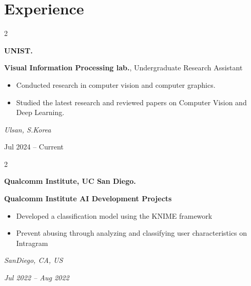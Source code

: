 \documentclass[10pt, letterpaper]{article}
\newenvironment{highlights}{
    \begin{itemize}[
        topsep=0.10 cm,
        parsep=0.10 cm,
        partopsep=0pt,
        itemsep=0pt,
        leftmargin=0.4 cm + 10pt
    ]
}{
    \end{itemize}
} %
\newenvironment{twocolentry}[2][]{
    \onecolentry
    \def\secondColumn{#2}
    \setcolumnwidth{\fill, 4.5 cm}
    \begin{paracol}{2}
}{
    \switchcolumn \raggedleft \secondColumn
    \end{paracol}
    \endonecolentry
} %
\begin{document}
    
    \section{Experience}

        \begin{twocolentry}{
            \small\textit{Ulsan, S.Korea}
            
            \vspace{0.1cm}
            
            Jul 2024 – Current
        }
            \textbf{\color{headingOrange}UNIST.}
                
            \vspace{0.2cm}
            
            \textbf{Visual Information Processing lab.}, Undergraduate Research Assistant
            \begin{highlights}
                \item Conducted research in computer vision and computer graphics.
                \item Studied the latest research and reviewed papers on Computer Vision and Deep Learning.
            \end{highlights}
        \end{twocolentry}
        
        \vspace{0.2 cm}
        


        \begin{twocolentry}{
            \small\textit{SanDiego, CA, US}
            
            \vspace{0.2cm}
            
            \textit{Jul 2022 – Aug 2022}
        }
            \textbf{\color{headingOrange}Qualcomm Institute, UC San Diego.}
            
            \vspace{0.2cm}
            
            \textbf{Qualcomm Institute AI Development Projects}
            \begin{highlights}
                \item Developed a classification model using the KNIME framework
                \item Prevent abusing through analyzing and classifying user characteristics on Intragram
            \end{highlights}
        \end{twocolentry}
        
\end{document}
